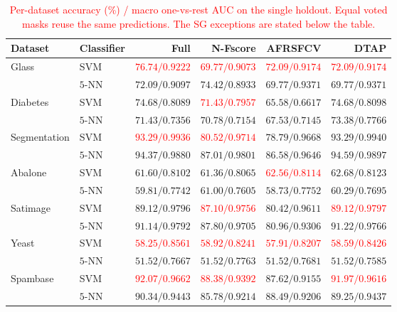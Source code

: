 \documentclass[]{interact}
\theoremstyle{plain}
\theoremstyle{definition}
\theoremstyle{remark}
\begin{document}
\begin{table}[htbp]
\centering\small\setlength{\tabcolsep}{4pt}
\caption{\textcolor{red}{Per-dataset accuracy (\%) / macro one-vs-rest AUC on the single holdout. Equal voted masks reuse the same predictions. The SG exceptions are stated below the table.}}\label{tab:acc}
\begin{tabular}{llrrrr}
\toprule
Dataset & Classifier & Full & N-Fscore & AFRSFCV & DTAP \\
\midrule
Glass & SVM & \leavevmode\textcolor{red}{$76.74/0.9222$} & \leavevmode\textcolor{red}{$69.77/0.9073$} & \leavevmode\textcolor{red}{$72.09/0.9174$} & \leavevmode\textcolor{red}{$72.09/0.9174$} \\
 & $5$-NN & $72.09/0.9097$ & $74.42/0.8933$ & $69.77/0.9371$ & $69.77/0.9371$ \\
Diabetes & SVM & $74.68/0.8089$ & \leavevmode\textcolor{red}{$71.43/0.7957$} & $65.58/0.6617$ & $74.68/0.8098$ \\
 & $5$-NN & $71.43/0.7356$ & $70.78/0.7154$ & $67.53/0.7145$ & $73.38/0.7766$ \\
Segmentation & SVM & \leavevmode\textcolor{red}{$93.29/0.9936$} & \leavevmode\textcolor{red}{$80.52/0.9714$} & $78.79/0.9668$ & $93.29/0.9940$ \\
 & $5$-NN & $94.37/0.9880$ & $87.01/0.9801$ & $86.58/0.9646$ & $94.59/0.9897$ \\
Abalone & SVM & $61.60/0.8102$ & $61.36/0.8065$ & \leavevmode\textcolor{red}{$62.56/0.8114$} & $62.68/0.8123$ \\
 & $5$-NN & $59.81/0.7742$ & $61.00/0.7605$ & $58.73/0.7752$ & $60.29/0.7695$ \\
Satimage & SVM & $89.12/0.9796$ & \leavevmode\textcolor{red}{$87.10/0.9756$} & $80.42/0.9611$ & \leavevmode\textcolor{red}{$89.12/0.9797$} \\
 & $5$-NN & $91.14/0.9792$ & $87.80/0.9705$ & $80.96/0.9306$ & $91.22/0.9766$ \\
Yeast & SVM & \leavevmode\textcolor{red}{$58.25/0.8561$} & \leavevmode\textcolor{red}{$58.92/0.8241$} & \leavevmode\textcolor{red}{$57.91/0.8207$} & \leavevmode\textcolor{red}{$58.59/0.8426$} \\
 & $5$-NN & $51.52/0.7667$ & $51.52/0.7763$ & $51.52/0.7681$ & $51.52/0.7585$ \\
Spambase & SVM & \leavevmode\textcolor{red}{$92.07/0.9662$} & \leavevmode\textcolor{red}{$88.38/0.9392$} & $87.62/0.9155$ & \leavevmode\textcolor{red}{$91.97/0.9616$} \\
 & $5$-NN & $90.34/0.9443$ & $85.78/0.9214$ & $88.49/0.9206$ & $89.25/0.9437$ \\

\end{tabular}
\end{table}
\end{document}
